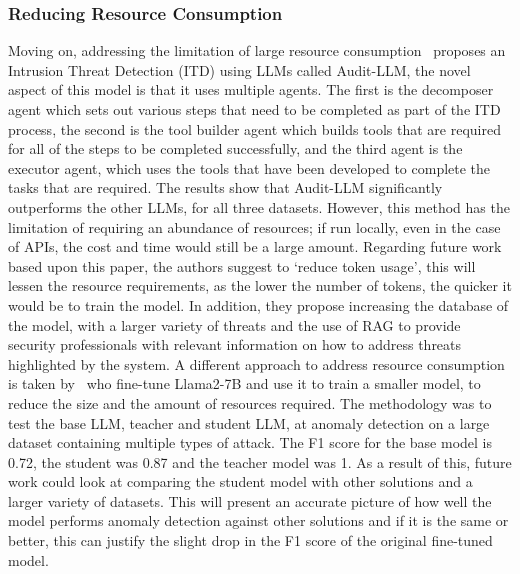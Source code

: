 \subsubsection{Reducing Resource Consumption}
Moving on, addressing the limitation of large resource consumption~\cite{song2024audit} proposes an Intrusion Threat Detection (ITD) using LLMs called Audit-LLM, the novel aspect of this model is that it uses multiple agents. The first is the decomposer agent which sets out various steps that need to be completed as part of the ITD process, the second is the tool builder agent which builds tools that are required for all of the steps to be completed successfully, and the third agent is the executor agent, which uses the tools that have been developed to complete the tasks that are required. The results show that Audit-LLM significantly outperforms the other LLMs, for all three datasets. However, this method has the limitation of requiring an abundance of resources; if run locally, even in the case of APIs, the cost and time would still be a large amount. Regarding future work based upon this paper, the authors suggest to `reduce token usage', this will lessen the resource requirements, as the lower the number of tokens, the quicker it would be to train the model. In addition, they propose increasing the database of the model, with a larger variety of threats and the use of RAG to provide security professionals with relevant information on how to address threats highlighted by the system. A different approach to address resource consumption is taken by~\cite{yang2024anomaly} who fine-tune Llama2-7B and use it to train a smaller model, to reduce the size and the amount of resources required. The methodology was to test the base LLM, teacher and student LLM, at anomaly detection on a large dataset containing multiple types of attack. The F1 score for the base model is 0.72, the student was 0.87 and the teacher model was 1. As a result of this, future work could look at comparing the student model with other solutions and a larger variety of datasets. This will present an accurate picture of how well the model performs anomaly detection against other solutions and if it is the same or better, this can justify the slight drop in the F1 score of the original fine-tuned model. 

